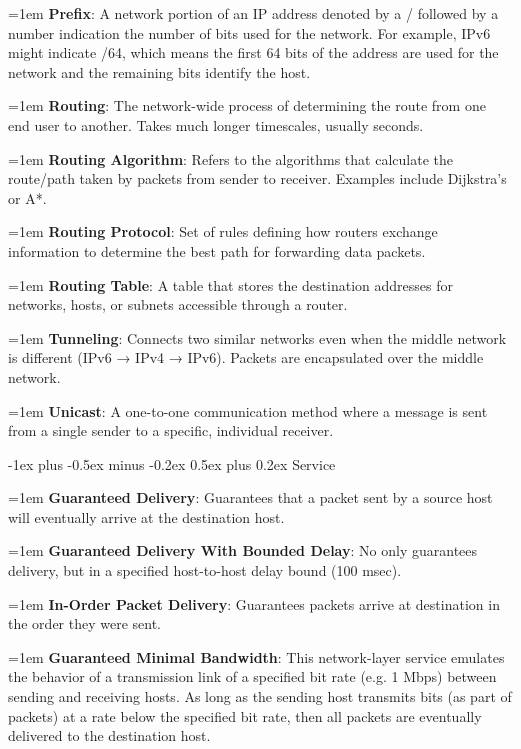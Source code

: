 \documentclass[letterpaper,8pt]{extarticle}
\makeatletter
\newcommand{\definition}[2]{
  \hangindent=1em
  \textbf{#1}: #2%
}
\renewcommand{\subsection}{\@startsection{subsection}{2}{0mm}%
  {-1ex plus -0.5ex minus -0.2ex}%
  {0.5ex plus 0.2ex}%
{\color{h2}\normalfont\fontsize{6}{6}\selectfont\bfseries}}
\makeatother
\begin{document}
\begin{multicols*}{5}
  \definition{Prefix}{A network portion of an IP address denoted by a / followed by a number indication the number of bits used for the network. For example, IPv6 might indicate /64, which means the first 64 bits of the address are used for the network and the remaining bits identify the host.}

  \definition{Routing}{The network-wide process of determining the route from one end user to another. Takes much longer timescales, usually seconds.}

  \definition{Routing Algorithm}{Refers to the algorithms that calculate the route/path taken by packets from sender to receiver. Examples include Dijkstra's or A*.}

  \definition{Routing Protocol}{Set of rules defining how routers exchange information to determine the best path for forwarding data packets.}

  \definition{Routing Table}{A table that stores the destination addresses for networks, hosts, or subnets accessible through a router.}

  \definition{Tunneling}{Connects two similar networks even when the middle network is different (IPv6 → IPv4 → IPv6). Packets are encapsulated over the middle network.}

  \definition{Unicast}{A one-to-one communication method where a message is sent from a single sender to a specific, individual receiver.}

  \subsection{Service}

  \definition{Guaranteed Delivery}{Guarantees that a packet sent by a source host will eventually arrive at the destination host.}

  \definition{Guaranteed Delivery With Bounded Delay}{No only guarantees delivery, but in a specified host-to-host delay bound (100 msec).}

  \definition{In-Order Packet Delivery}{Guarantees packets arrive at destination in the order they were sent.}

  \definition{Guaranteed Minimal Bandwidth}{This network-layer service emulates the behavior of a transmission link of a specified bit rate (e.g. 1 Mbps) between sending and receiving hosts. As long as the sending host transmits bits (as part of packets) at a rate below the specified bit rate, then all packets are eventually delivered to the destination host.}


\end{multicols*}
\end{document}

